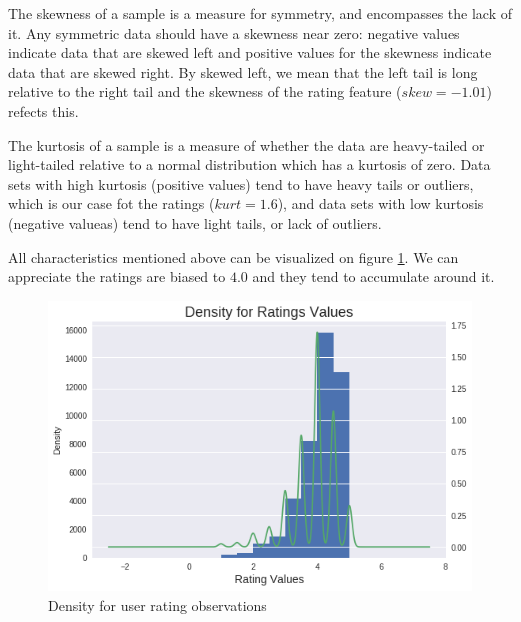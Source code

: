 \documentclass[letterpaper, 10 pt, conference]{ieeeconf}  %
\begin{document}
\begin{enumerate}
\begin{itemize}
        
        
        \justify
        
        The skewness of a sample is a measure for symmetry, and encompasses the lack of it. Any symmetric data should have a skewness near zero: negative values indicate data that are skewed left and positive values for the skewness indicate data that are skewed right. By skewed left, we mean that the left tail is long relative to the right tail and the skewness of the rating feature ($skew = -1.01$) refects this.
        
        The kurtosis of a sample is a measure of whether the data are heavy-tailed or light-tailed relative to a normal distribution which has a kurtosis of zero. Data sets with high kurtosis (positive values) tend to have heavy tails or outliers, which is our case fot the ratings ($kurt =1.6$), and data sets with low kurtosis (negative valueas) tend to have light tails, or lack of outliers. 
        
        All characteristics mentioned above can be visualized on figure \ref{fig:density-ranting-values}. We can appreciate the ratings are biased to $4.0$ and they tend to accumulate around it.
        
        \begin{figure}[h]
            \includegraphics[scale=0.4]{density-ranting-values.png}
            \centering
            \caption{Density for user rating observations}
            \label{fig:density-ranting-values}
        \end{figure}
        

\end{itemize}
\end{enumerate}
\end{document}
